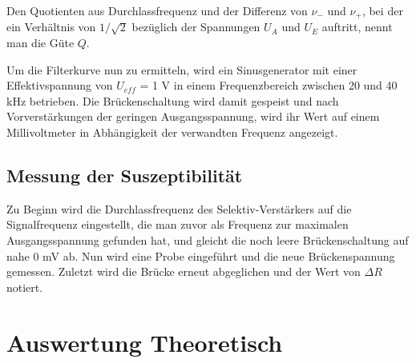 Den Quotienten aus Durchlassfrequenz und der Differenz von $\nu_-$ und $\nu_+$, bei der ein Verhältnis von $1/\sqrt{2}$ bezüglich der 
Spannungen $U_A$ und $U_E$ auftritt, nennt man die Güte $Q$.

Um die Filterkurve nun zu ermitteln, wird ein Sinusgenerator mit einer Effektivspannung von $U_{eff}$ = 1 V in einem Frequenzbereich 
zwischen 20 und 40 kHz betrieben. Die Brückenschaltung wird damit gespeist und nach Vorverstärkungen der geringen Ausgangsspannung,
wird ihr Wert auf einem Millivoltmeter in Abhängigkeit der verwandten Frequenz angezeigt.

\subsection{Messung der Suszeptibilität}
Zu Beginn wird die Durchlassfrequenz des Selektiv-Verstärkers auf die Signalfrequenz eingestellt, die man zuvor als Frequenz zur maximalen
Ausgangsspannung gefunden hat, und gleicht die noch leere Brückenschaltung auf nahe 0 mV ab. Nun wird eine Probe eingeführt und die
neue Brückenspannung gemessen. Zuletzt wird die Brücke erneut abgeglichen und der Wert von $\Delta R$ notiert. 

\section{Auswertung Theoretisch}
